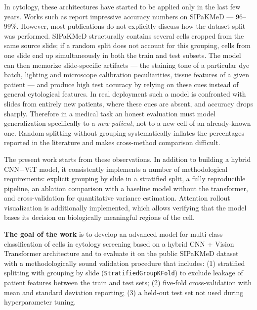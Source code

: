 \documentclass[14pt,a4paper]{extreport}
\begin{document}
In cytology, these architectures have started to be applied only in the
last few years. Works such as \cite{cerviformer2023, cervigan2025,
hybridvit2025} report impressive accuracy numbers on SIPaKMeD ---
96--99\%. However, most publications do not explicitly discuss how the
dataset split was performed. SIPaKMeD structurally contains several
cells cropped from the same source slide; if a random split does not
account for this grouping, cells from one slide end up simultaneously in
both the train and test subsets. The model can then memorize
slide-specific artifacts --- the staining tone of a particular dye
batch, lighting and microscope calibration peculiarities, tissue
features of a given patient --- and produce high test accuracy by
relying on these cues instead of general cytological features. In real
deployment such a model is confronted with slides from entirely new
patients, where these cues are absent, and accuracy drops sharply.
Therefore in a medical task an honest evaluation must model
generalization specifically to a \textit{new patient}, not to a new cell
of an already-known one. Random splitting without grouping
systematically inflates the percentages reported in the literature and
makes cross-method comparison difficult.

The present work starts from these observations. In addition to building
a hybrid CNN+ViT model, it consistently implements a number of
methodological requirements: explicit grouping by slide in a stratified
split, a fully reproducible pipeline, an ablation comparison with a
baseline model without the transformer, and cross-validation for
quantitative variance estimation. Attention rollout visualization is
additionally implemented, which allows verifying that the model bases
its decision on biologically meaningful regions of the cell.

\textbf{The goal of the work} is to develop an advanced model for
multi-class classification of cells in cytology screening based on a
hybrid CNN + Vision Transformer architecture and to evaluate it on the
public SIPaKMeD dataset with a methodologically sound validation
procedure that includes: (1) stratified splitting with grouping by slide
(\texttt{StratifiedGroupKFold}) to exclude leakage of patient features
between the train and test sets; (2) five-fold cross-validation with
mean and standard deviation reporting; (3) a held-out test set not used
during hyperparameter tuning.
\end{document}
